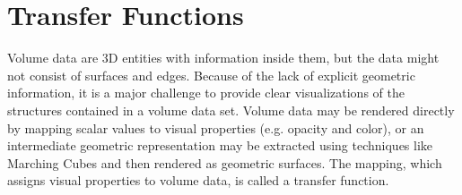 
\section{Transfer Functions \label{literature_of_transfer_function}}
Volume data are 3D entities with information inside them, but the data might not consist of surfaces and edges.
Because of the lack of explicit geometric information, %
it is a major challenge to provide clear visualizations of the structures contained in a volume data set.
Volume data may be rendered directly by mapping scalar values to visual properties (e.g. opacity and color), or an intermediate geometric representation may be extracted using techniques like Marching Cubes \cite{lorensen_marching_1987} and then rendered as geometric surfaces. The mapping, which assigns visual properties to volume data, is called a transfer function.

